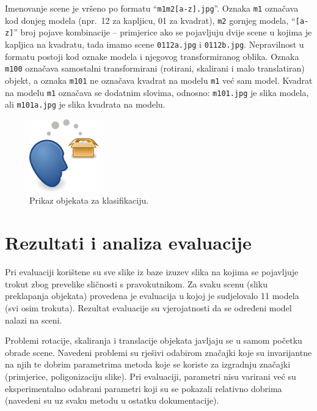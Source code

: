 \documentclass[lmodern, utf8, seminar, numeric]{fer}
\begin{document}
Imenovanje scene je vršeno po formatu ``\texttt{m1m2[a-z]\*.jpg}''. Oznaka \texttt{m1} označava kod donjeg modela (npr.\ 12 za kapljicu, 01 za kvadrat), \texttt{m2} gornjeg modela, ``\texttt{[a-z]\*}'' broj pojave kombinacije -- primjerice ako se pojavljuju dvije scene u kojima je kapljica na kvadratu, tada imamo scene \texttt{0112a.jpg} i \texttt{0112b.jpg}. Nepravilnost u formatu postoji kod oznake modela i njegovog transformiranog oblika. Oznaka \texttt{m100} označava samostalni transformirani (rotirani, skalirani i malo translatiran) objekt, a oznaka \texttt{m101} ne označava kvadrat na modelu \texttt{m1} već sam model. Kvadrat na modelu \texttt{m1} označava se dodatnim slovima, odnosno: \texttt{m101.jpg} je slika modela, ali \texttt{m101a.jpg} je slika kvadrata na modelu.

\begin{figure}[htb]
\begin{center}
\includegraphics[width=3cm]{resources/img.png}
\end{center}
\caption{Prikaz objekata za klasifikaciju.} 
\label{fig:baza}
\end{figure}

\section{Rezultati i analiza evaluacije}
Pri evaluaciji korištene su sve slike iz baze izuzev slika na kojima se pojavljuje trokut zbog prevelike sličnosti s pravokutnikom. Za svaku scenu (sliku preklapanja objekata) provedena je evaluacija u kojoj je sudjelovalo 11 modela (svi osim trokuta). Rezultat evaluacije su vjerojatnosti da se određeni model nalazi na sceni.

Problemi rotacije, skaliranja i translacije objekata javljaju se u samom početku obrade scene. Navedeni problemi su rješivi odabirom značajki koje su invarijantne na njih te dobrim parametrima metoda koje se koriste za izgradnju značajki (primjerice, poligonizaciju slike). Pri evaluaciji, parametri nisu varirani već su eksperimentalno odabrani parametri koji su se pokazali relativno dobrima (navedeni su uz svaku metodu u ostatku dokumentacije).
\end{document}
